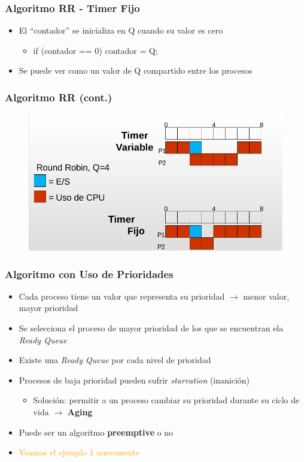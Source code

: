 \begin{frame}
  \frametitle{Algoritmo \textbf{RR - Timer Fijo}}
  \begin{itemize}
  		\item El ``contador'' se inicializa en Q cuando su valor es cero
  		\begin{itemize}
  			\item if (contador == 0) contador = Q;
  		\end{itemize}
		\item Se puede ver como un valor de Q compartido entre los procesos
  \end{itemize}
\end{frame}

\begin{frame}
  \frametitle{Algoritmo \textbf{RR} (cont.)}
	\begin{figure}
	    \includegraphics[scale=0.4]{images/ejemploRR.png}
	\end{figure}
\end{frame}

\begin{frame}
  \frametitle{Algoritmo con \textbf{Uso de Prioridades}}
  \begin{itemize}
  		\item Cada proceso tiene un valor que representa su prioridad $\rightarrow$ menor valor, mayor prioridad
		\item Se selecciona el proceso de mayor prioridad de los que se encuentran ela \emph{Ready Queue}
		\item Existe una \emph{Ready Queue} por cada nivel de prioridad
		\item Procesos de baja prioridad pueden sufrir \emph{starvation} (inanición)
		\begin{itemize}
			\item Solución: permitir a un proceso cambiar su prioridad durante su ciclo de vida $\rightarrow$ \textbf{Aging}
		\end{itemize}
		\item Puede ser un algoritmo \textbf{preemptive} o no
		\pause
		\item \textcolor{orange}{Veamos el ejemplo 1 nuevamente}
  \end{itemize}
\end{frame}

